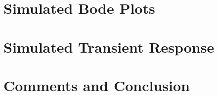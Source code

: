 \documentclass[12pt,a4paper]{article}
\begin{document}
\section{Simulated Bode Plots}



\pagebreak



\section{Simulated Transient Response}

\pagebreak




\section{Comments and Conclusion}
\end{document}

